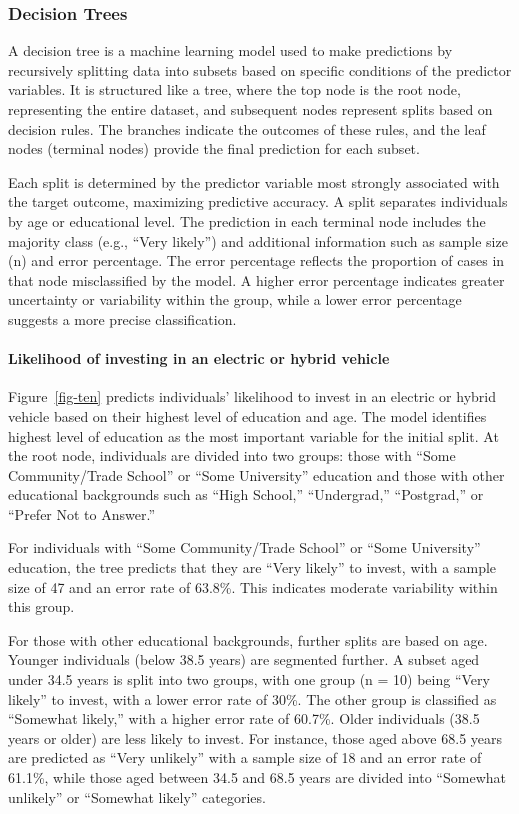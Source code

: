 \documentclass[
  letterpaper,
  DIV=11,
  numbers=noendperiod]{scrartcl}
\let\oldparagraph\paragraph
\renewcommand{\paragraph}[1]{\oldparagraph{#1}\mbox{}}
\begin{document}
\subsubsection{Decision Trees}\label{decision-trees}

A decision tree is a machine learning model used to make predictions by
recursively splitting data into subsets based on specific conditions of
the predictor variables. It is structured like a tree, where the top
node is the root node, representing the entire dataset, and subsequent
nodes represent splits based on decision rules. The branches indicate
the outcomes of these rules, and the leaf nodes (terminal nodes) provide
the final prediction for each subset.

Each split is determined by the predictor variable most strongly
associated with the target outcome, maximizing predictive accuracy. A
split separates individuals by age or educational level. The prediction
in each terminal node includes the majority class (e.g., ``Very
likely'') and additional information such as sample size (n) and error
percentage. The error percentage reflects the proportion of cases in
that node misclassified by the model. A higher error percentage
indicates greater uncertainty or variability within the group, while a
lower error percentage suggests a more precise classification.

\paragraph{Likelihood of investing in an electric or hybrid
vehicle}\label{likelihood-of-investing-in-an-electric-or-hybrid-vehicle}

Figure~\ref{fig-ten} predicts individuals' likelihood to invest in an
electric or hybrid vehicle based on their highest level of education and
age. The model identifies highest level of education as the most
important variable for the initial split. At the root node, individuals
are divided into two groups: those with ``Some Community/Trade School''
or ``Some University'' education and those with other educational
backgrounds such as ``High School,'' ``Undergrad,'' ``Postgrad,'' or
``Prefer Not to Answer.''

For individuals with ``Some Community/Trade School'' or ``Some
University'' education, the tree predicts that they are ``Very likely''
to invest, with a sample size of 47 and an error rate of 63.8\%. This
indicates moderate variability within this group.

For those with other educational backgrounds, further splits are based
on age. Younger individuals (below 38.5 years) are segmented further. A
subset aged under 34.5 years is split into two groups, with one group (n
= 10) being ``Very likely'' to invest, with a lower error rate of 30\%.
The other group is classified as ``Somewhat likely,'' with a higher
error rate of 60.7\%. Older individuals (38.5 years or older) are less
likely to invest. For instance, those aged above 68.5 years are
predicted as ``Very unlikely'' with a sample size of 18 and an error
rate of 61.1\%, while those aged between 34.5 and 68.5 years are divided
into ``Somewhat unlikely'' or ``Somewhat likely'' categories.
\end{document}
